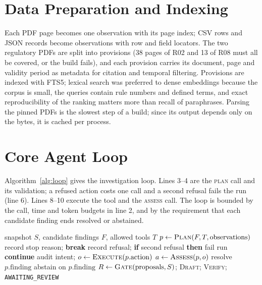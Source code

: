 \section{Data Preparation and Indexing}
Each PDF page becomes one observation with its page index; CSV rows and JSON records become
observations with row and field locators. The two regulatory PDFs are split into provisions
(38 pages of R02 and 13 of R08 must all be covered, or the build fails), and each provision carries
its document, page and validity period as metadata for citation and temporal filtering. Provisions
are indexed with FTS5; lexical search was preferred to dense embeddings because the corpus is
small, the queries contain rule numbers and defined terms, and exact reproducibility of the ranking
matters more than recall of paraphrases. Parsing the pinned PDFs is the slowest step of a build;
since its output depends only on the bytes, it is cached per process.

\section{Core Agent Loop}
Algorithm~\ref{alg:loop} gives the investigation loop. Lines 3--4 are the \textsc{plan} call and
its validation; a refused action costs one call and a second refusal fails the run (line 6).
Lines 8--10 execute the tool and the \textsc{assess} call. The loop is bounded by the call, time
and token budgets in line 2, and by the requirement that each candidate finding ends resolved or
abstained.

\begin{algorithm}[H]
\caption{ReCycleGuard investigation loop}
\label{alg:loop}
\begin{algorithmic}[1]
\Require snapshot $S$, candidate findings $F$, allowed tools $T$
  \State $p \gets \textsc{Plan}(F, T, \text{observations})$ 
   \State record stop reason; \textbf{break} \EndIf
    \State record refusal; \textbf{if} second refusal \textbf{then} fail run
    \State \textbf{continue}
  \EndIf
  \State audit intent; $o \gets \textsc{Execute}(p.\text{action})$ 
  \State $a \gets \textsc{Assess}(p, o)$ 
   resolve $p.\text{finding}$
   abstain on $p.\text{finding}$ \EndIf
\EndWhile
\State $R \gets \textsc{Gate}(\text{proposals}, S)$; \textsc{Draft}; \textsc{Verify}; \Return \texttt{AWAITING\_REVIEW}
\end{algorithmic}
\end{algorithm}

